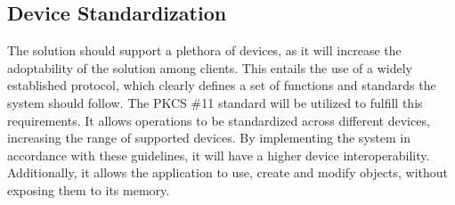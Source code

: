 \subsection{Device Standardization}\label{chap:implementation:standards}

The solution should support a plethora of devices, as it will increase the adoptability of the solution among clients. This entails the use of a widely established protocol, which clearly defines a set of functions and standards the system should follow.
The \ac{PKCS} \#11 standard will be utilized to fulfill this requirements. It allows operations to be standardized across different devices, increasing the range of supported devices. By implementing the system in accordance with these guidelines, it will have a higher device interoperability. Additionally, it allows the application to use, create and modify objects, without exposing them to its memory.

